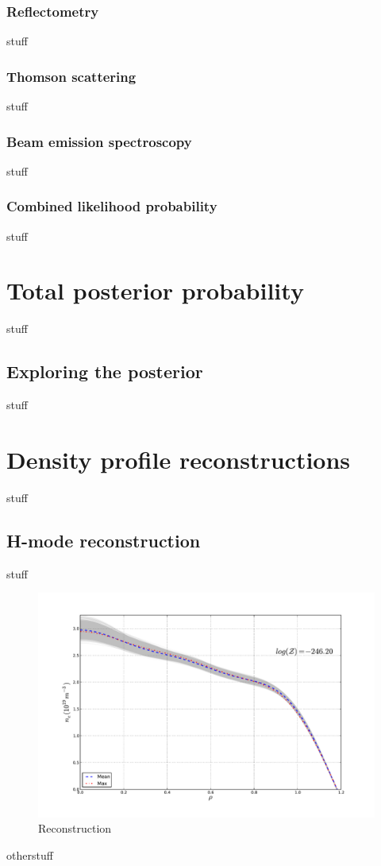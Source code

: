 \documentclass[12pt]{article}
\numberwithin{equation}{section}
\begin{document}
\subsubsection{Reflectometry}
stuff
\subsubsection{Thomson scattering}
stuff
\subsubsection{Beam emission spectroscopy}
stuff
\subsubsection{Combined likelihood probability}
stuff
\section{Total posterior probability}
stuff
\subsection{Exploring the posterior}
stuff
\section{Density profile reconstructions}
stuff
\subsection{H-mode reconstruction}
stuff
\begin{figure}[ht]
	\centering
	\includegraphics[width=12cm,keepaspectratio=true]{figures/bfit146102_00505_all5}
	\vspace{-30pt}
	\caption{Reconstruction}
\end{figure}
otherstuff
\end{document}
